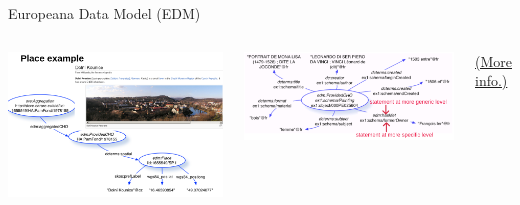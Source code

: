 \begin{frame}[allowframebreaks]{Europeana Data Model (EDM)}
\begin{columns}
\includegraphics[width=\textwidth]{img/edm-example2.png}

\includegraphics[width=\textwidth]{img/edm-example3.png}

\href{https://pro.europeana.eu/files/Europeana_Professional/Share_your_data/Technical_requirements/EDM_Documentation/EDM_slides_130714.ppt}{(More info.)}
\end{columns}

\end{frame}

